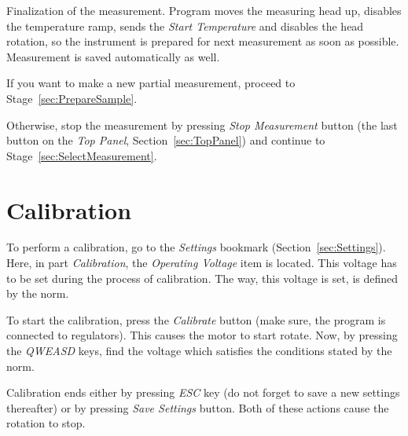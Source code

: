 \documentclass[a4paper,11pt,oneside]{report}
\theoremstyle{named}
\begin{document}
Finalization of the measurement. Program moves the measuring head up, disables
the temperature ramp, sends the \textit{Start Temperature} and disables the head
rotation, so the instrument is prepared for next measurement as soon as
possible. Measurement is saved automatically as well.

If you want to make a new partial measurement, proceed to
Stage~\ref{sec:PrepareSample}.

Otherwise, stop the measurement by pressing \textit{Stop Measurement} button
(the last button on the \textit{Top Panel}, Section~\ref{sec:TopPanel}) and
continue to Stage~\ref{sec:SelectMeasurement}.


\section{Calibration}
\label{sec:Calibration}

To perform a calibration, go to the \textit{Settings} bookmark
(Section~\ref{sec:Settings}). Here, in part \textit{Calibration}, the
\textit{Operating Voltage} item is located. This voltage has to be set during the
process of calibration. The way, this voltage is set, is defined by the norm.

To start the calibration, press the \textit{Calibrate} button (make sure, the
program is connected to regulators). This causes the motor to start rotate. Now,
by pressing the \textit{QWEASD} keys, find the voltage which satisfies the
conditions stated by the norm. 

Calibration ends either by pressing \textit{ESC} key (do not forget to save a new
settings thereafter) or by pressing \textit{Save Settings} button. Both of these
actions cause the rotation to stop.
\end{document}
